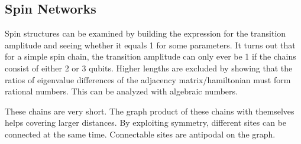 \subsection{Spin Networks}

\begin{center}
\end{center}

\noindent Spin structures can be examined by building the expression for the transition amplitude and seeing whether it equals 1 for some parameters. It turns out that for a simple spin chain, the transition amplitude can only ever be 1 if the chains consist of either 2 or 3 qubits\cite{Christandl2005}. Higher lengths are excluded by showing that the ratios of eigenvalue differences of the adjacency matrix/hamiltonian must form rational numbers. This can be analyzed with algebraic numbers.\par
These chains are very short. The graph product of these chains with themselves helps covering larger distances. By exploiting symmetry, different sites can be connected at the same time. Connectable sites are antipodal on the graph.

